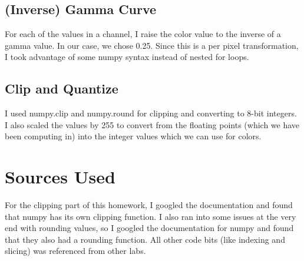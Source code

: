 \documentclass[11pt]{article}
\begin{document}
\subsection{(Inverse) Gamma Curve}

For each of the values in a channel, I raise the color value to the inverse of a gamma value.
In our case, we chose 0.25.
Since this is a per pixel transformation, I took advantage of some numpy syntax instead of nested for loops.

\subsection{Clip and Quantize}

I used numpy.clip and numpy.round for clipping and converting to 8-bit integers.
I also scaled the values by 255 to convert from the floating points (which we have been computing in) into the integer values which we can use for colors.

\section{Sources Used}

For the clipping part of this homework, I googled the documentation and found that numpy has its own clipping function.
I also ran into some issues at the very end with rounding values, so I googled the documentation for numpy and found that they also had a rounding function.
All other code bits (like indexing and slicing) was referenced from other labs.
\end{document}
